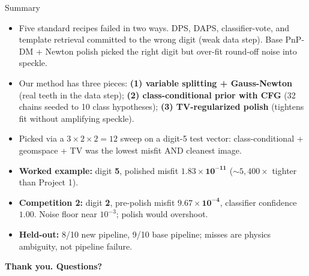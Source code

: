 \documentclass[aspectratio=169,10pt]{beamer}
\begin{document}
\begin{frame}{Summary}
\footnotesize
\begin{itemize}\itemsep=4pt
\item Five standard recipes failed in two ways. DPS, DAPS,
  classifier-vote, and template retrieval committed to the wrong digit
  (weak data step). Base PnP-DM + Newton polish picked the right digit
  but over-fit round-off noise into speckle.
\item Our method has three pieces: \textbf{(1) variable splitting +
  Gauss-Newton} (real teeth in the data step); \textbf{(2)
  class-conditional prior with CFG} (32 chains seeded to 10 class
  hypotheses); \textbf{(3) TV-regularized polish} (tightens fit without
  amplifying speckle).
\item Picked via a $3 \times 2 \times 2 = 12$ sweep on a digit-5
  test vector: class-conditional + geomspace + TV was the lowest
  misfit AND cleanest image.
\item \textbf{Worked example:} digit \textbf{5}, polished misfit
  \textcolor{osuorange}{$\mathbf{1.83 \times 10^{-11}}$}
  ($\sim 5{,}400\times$ tighter than Project 1).
\item \textbf{Competition 2:} digit \textbf{2}, pre-polish misfit
  \textcolor{osuorange}{$\mathbf{9.67 \times 10^{-4}}$}, classifier
  confidence $1.00$. Noise floor near $10^{-3}$; polish would overshoot.
\item \textbf{Held-out:} 8/10 new pipeline, 9/10 base pipeline; misses
  are physics ambiguity, not pipeline failure.
\end{itemize}

\vspace{0.3em}
\begin{center}
{\large\textcolor{osuorange}{\textbf{Thank you. Questions?}}}
\end{center}
\end{frame}
\end{document}
